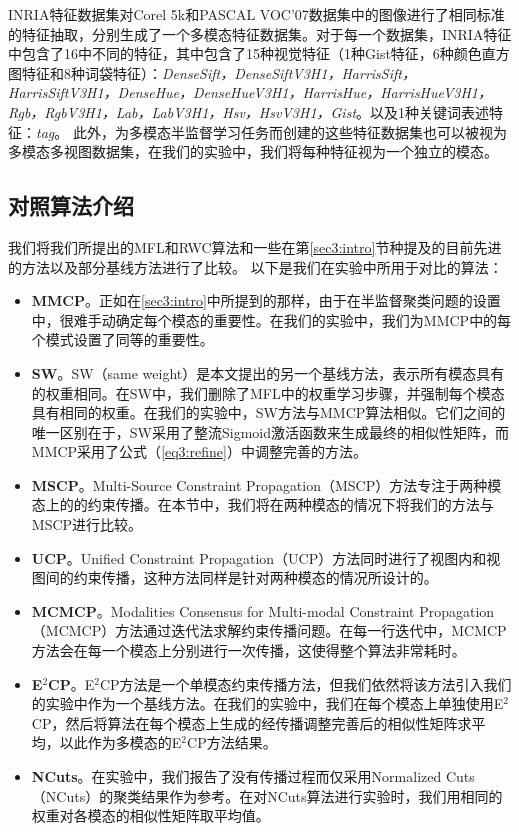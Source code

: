 INRIA特征数据集\cite{guillaumin2009tagprop}对Corel 5k和PASCAL VOC'07数据集中的图像进行了相同标准的特征抽取，分别生成了一个多模态特征数据集。对于每一个数据集，INRIA特征中包含了16中不同的特征，其中包含了15种视觉特征（1种Gist特征，6种颜色直方图特征和8种词袋特征）：\textit{DenseSift，DenseSiftV3H1，HarrisSift，HarrisSiftV3H1，DenseHue，DenseHueV3H1，HarrisHue，HarrisHueV3H1，Rgb，RgbV3H1，Lab，LabV3H1，Hsv，HsvV3H1，Gist}。以及1种关键词表述特征：\textit{tag}。
此外，为多模态半监督学习任务而创建的这些特征数据集也可以被视为多模态多视图数据集，在我们的实验中，我们将每种特征视为一个独立的模态。

\subsection{对照算法介绍}
我们将我们所提出的MFL和RWC算法和一些在第\ref{sec3:intro}节种提及的目前先进的方法以及部分基线方法进行了比较。
以下是我们在实验中所用于对比的算法：
\begin{itemize}
    \item {\textbf{MMCP}}。正如在\ref{sec3:intro}中所提到的那样，由于在半监督聚类问题的设置中，很难手动确定每个模态的重要性。在我们的实验中，我们为MMCP\cite{fu2011multi}中的每个模式设置了同等的重要性。
    \item {\textbf{SW}}。SW（same weight）是本文提出的另一个基线方法，表示所有模态具有的权重相同。在SW中，我们删除了MFL中的权重学习步骤，并强制每个模态具有相同的权重。在我们的实验中，SW方法与MMCP算法相似。它们之间的唯一区别在于，SW采用了整流Sigmoid激活函数来生成最终的相似性矩阵，而MMCP采用了公式（\ref{eq3:refine}）中调整完善的方法。
    \item {\textbf{MSCP}}。Multi-Source Constraint Propagation（MSCP）\cite{lu2013exhaustive}方法专注于两种模态上的的约束传播。在本节中，我们将在两种模态的情况下将我们的方法与MSCP进行比较。
    \item {\textbf{UCP}}。Unified Constraint Propagation（UCP）\cite{lu2013unified}方法同时进行了视图内和视图间的约束传播，这种方法同样是针对两种模态的情况所设计的。
    \item {\textbf{MCMCP}}。Modalities Consensus for Multi-modal Constraint Propagation（MCMCP）\cite{fu2012modalities}方法通过迭代法求解约束传播问题。在每一行迭代中，MCMCP方法会在每一个模态上分别进行一次传播，这使得整个算法非常耗时。
    \item {\textbf{E$^2$CP}}。E$^2$CP\cite{lu2010constrained}方法是一个单模态约束传播方法，但我们依然将该方法引入我们的实验中作为一个基线方法。在我们的实验中，我们在每个模态上单独使用E$^2$CP，然后将算法在每个模态上生成的经传播调整完善后的相似性矩阵求平均，以此作为多模态的E$^2$CP方法结果。
    \item {\textbf{NCuts}}。在实验中，我们报告了没有传播过程而仅采用Normalized Cuts（NCuts）\cite{shi2000normalized}的聚类结果作为参考。在对NCuts算法进行实验时，我们用相同的权重对各模态的相似性矩阵取平均值。
\end{itemize}

